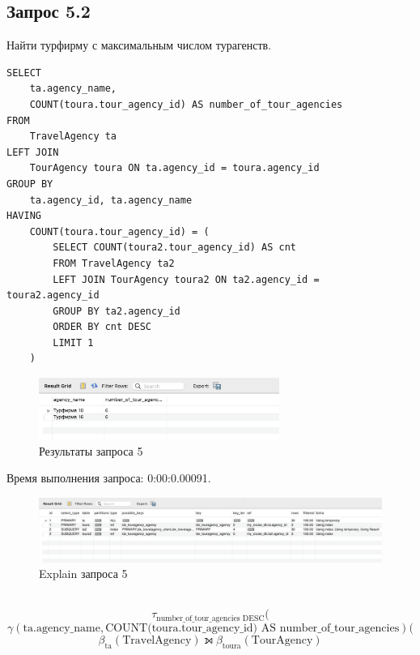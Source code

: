\documentclass[11pt,a4paper,final]{article}
\begin{document}
\subsection{Запрос 5.2}
Найти турфирму с максимальным числом турагенств.
\begin{lstlisting}[style=sqlstyle, label=sql:query1]
SELECT 
    ta.agency_name, 
    COUNT(toura.tour_agency_id) AS number_of_tour_agencies
FROM 
    TravelAgency ta
LEFT JOIN 
    TourAgency toura ON ta.agency_id = toura.agency_id
GROUP BY 
    ta.agency_id, ta.agency_name
HAVING 
    COUNT(toura.tour_agency_id) = (
        SELECT COUNT(toura2.tour_agency_id) AS cnt
        FROM TravelAgency ta2
        LEFT JOIN TourAgency toura2 ON ta2.agency_id = toura2.agency_id
        GROUP BY ta2.agency_id
        ORDER BY cnt DESC
        LIMIT 1
    )
\end{lstlisting}
\begin{figure}[h!]
    \centering
    \includegraphics[width=0.7\textwidth]{20.png} 
    \caption{Результаты запроса 5}
\end{figure}
{\centering
Время выполнения запроса: 0:00:0.00091.\par}
\begin{figure}[H]
    \centering
    \includegraphics[width=\textwidth]{21.png} 
    \caption{Explain запроса 5}
\end{figure}
\\
$$
\tau_{\text{number\_of\_tour\_agencies DESC}}(
$$
$$
\gamma(\text{ta.agency\_name}, \text{COUNT(toura.tour\_agency\_id) AS number\_of\_tour\_agencies})(
$$
$$
\beta_{\text{ta}}(\text{TravelAgency}) \leftouterjoin \beta_{\text{toura}}(\text{TourAgency})
$$
\end{document}

